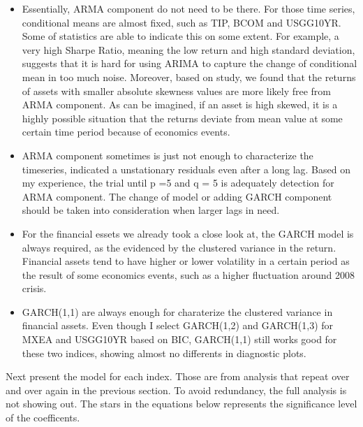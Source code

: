 \documentclass[12pt]{article}
\begin{document}
\begin{itemize}
\item Essentially, ARMA component do not need to be there. For those time series, conditional means are almost fixed, such as TIP, BCOM and USGG10YR. Some of statistics are able to indicate this on some extent. For example, a very high Sharpe Ratio, meaning the low return and high standard deviation, suggests that it is hard for using ARIMA  to capture the change of conditional mean in too much noise. Moreover, based on study, we found that the returns of assets with smaller absolute skewness values are more likely free from ARMA component. As can be imagined, if an asset is high skewed, it is a highly possible situation that the returns deviate from mean value at some certain time period because of economics events.
\item ARMA component sometimes is just not enough to characterize the timeseries, indicated a unstationary residuals even after a long lag. Based on my experience, the trial until p =5 and q = 5 is adequately detection for ARMA component. The change of model or adding GARCH component should be taken into consideration when larger lags in need.
 \item For the financial essets we already took a close look at, the GARCH model is always required, as the evidenced by the clustered variance in the return. Financial assets tend to have higher or lower volatility in a certain period as the result of some economics events, such as a higher fluctuation around 2008 crisis.
  \item GARCH(1,1) are always enough for charaterize the clustered variance in financial assets. Even though I select GARCH(1,2) and GARCH(1,3) for MXEA and USGG10YR based on BIC, GARCH(1,1) still works good for these two indices, showing almost no differents in diagnostic plots. 
\end{itemize}


Next present the model for each index. Those are from analysis that repeat over and over again in the previous section. To avoid redundancy, the full analysis is not showing out. The stars in the equations below represents the significance level of the coefficents. 
\end{document}
